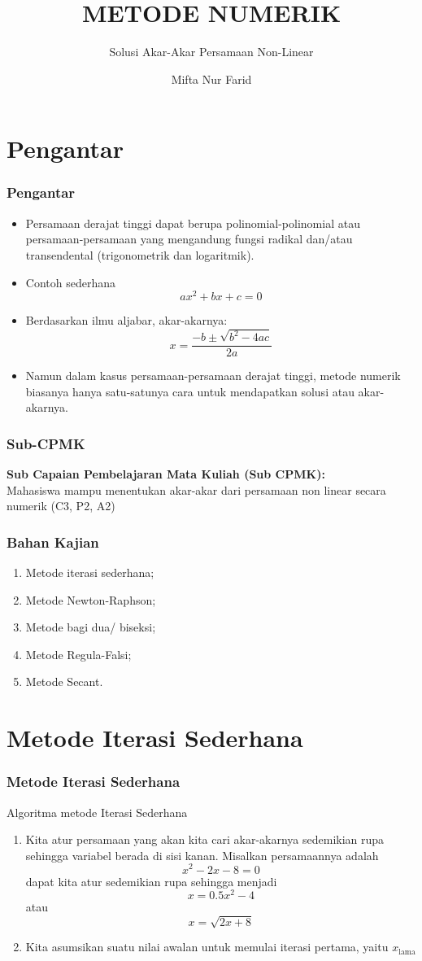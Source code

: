 \documentclass[pdflatex,compress,mathserif]{beamer}
\title{METODE NUMERIK}
\subtitle{Solusi Akar-Akar Persamaan Non-Linear}
\author{Mifta Nur Farid}
\begin{document}
\maketitle

\section{Pengantar}

\begin{frame}
	\frametitle{Pengantar}
	\begin{itemize}
		\item Persamaan derajat tinggi dapat berupa polinomial-polinomial atau persamaan-persamaan yang mengandung fungsi radikal dan/atau transendental (trigonometrik dan logaritmik).
		\item Contoh sederhana
		$$ ax^2 + bx + c = 0 $$
		\item Berdasarkan ilmu aljabar, akar-akarnya:
		$$ x = \frac{-b \pm \sqrt{b^2 - 4ac}}{2a} $$
		\item Namun dalam kasus persamaan-persamaan derajat tinggi, metode numerik biasanya hanya satu-satunya cara untuk mendapatkan solusi atau akar-akarnya.
	\end{itemize}
\end{frame}

\begin{frame}
	\frametitle{Sub-CPMK}
	\textbf{Sub Capaian Pembelajaran Mata Kuliah (Sub CPMK):}\\Mahasiswa mampu menentukan akar-akar dari persamaan non linear secara numerik (C3, P2, A2)
\end{frame}

\begin{frame}
	\frametitle{Bahan Kajian}
	\begin{enumerate}
		\item Metode iterasi sederhana;
		\item Metode Newton-Raphson;
		\item Metode bagi dua/ biseksi;
		\item Metode Regula-Falsi;
		\item Metode Secant.
	\end{enumerate}
\end{frame}

\section{Metode Iterasi Sederhana}

\begin{frame}
	\frametitle{Metode Iterasi Sederhana}
	Algoritma metode Iterasi Sederhana
	\begin{enumerate}
		\item Kita atur persamaan yang akan kita cari akar-akarnya sedemikian rupa sehingga variabel berada di sisi kanan. Misalkan persamaannya adalah
		$$ x^2 - 2x - 8 = 0 $$
		dapat kita atur sedemikian rupa sehingga menjadi
		$$ x = 0.5x^2 - 4 $$ atau $$ x = \sqrt{2x+8} $$
		\item Kita asumsikan suatu nilai awalan untuk memulai iterasi pertama, yaitu $x_\text{lama}$
	\end{enumerate}
\end{frame}
\end{document}
